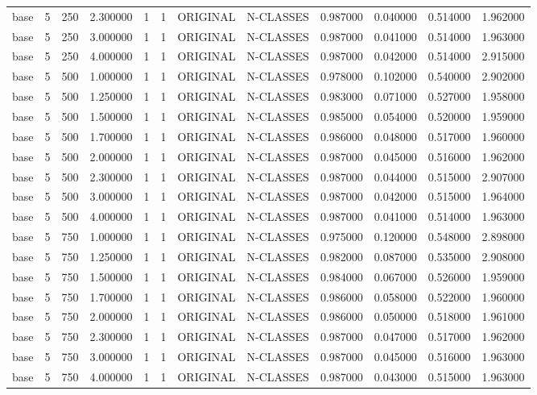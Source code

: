 \begin{tabular}{lrrrllllrrrr}
base & 5 & 250 & 2.300000 & 1 & 1 & ORIGINAL & N-CLASSES & 0.987000 & 0.040000 & 0.514000 & 1.962000 \\
base & 5 & 250 & 3.000000 & 1 & 1 & ORIGINAL & N-CLASSES & 0.987000 & 0.041000 & 0.514000 & 1.963000 \\
base & 5 & 250 & 4.000000 & 1 & 1 & ORIGINAL & N-CLASSES & 0.987000 & 0.042000 & 0.514000 & 2.915000 \\
base & 5 & 500 & 1.000000 & 1 & 1 & ORIGINAL & N-CLASSES & 0.978000 & 0.102000 & 0.540000 & 2.902000 \\
base & 5 & 500 & 1.250000 & 1 & 1 & ORIGINAL & N-CLASSES & 0.983000 & 0.071000 & 0.527000 & 1.958000 \\
base & 5 & 500 & 1.500000 & 1 & 1 & ORIGINAL & N-CLASSES & 0.985000 & 0.054000 & 0.520000 & 1.959000 \\
base & 5 & 500 & 1.700000 & 1 & 1 & ORIGINAL & N-CLASSES & 0.986000 & 0.048000 & 0.517000 & 1.960000 \\
base & 5 & 500 & 2.000000 & 1 & 1 & ORIGINAL & N-CLASSES & 0.987000 & 0.045000 & 0.516000 & 1.962000 \\
base & 5 & 500 & 2.300000 & 1 & 1 & ORIGINAL & N-CLASSES & 0.987000 & 0.044000 & 0.515000 & 2.907000 \\
base & 5 & 500 & 3.000000 & 1 & 1 & ORIGINAL & N-CLASSES & 0.987000 & 0.042000 & 0.515000 & 1.964000 \\
base & 5 & 500 & 4.000000 & 1 & 1 & ORIGINAL & N-CLASSES & 0.987000 & 0.041000 & 0.514000 & 1.963000 \\
base & 5 & 750 & 1.000000 & 1 & 1 & ORIGINAL & N-CLASSES & 0.975000 & 0.120000 & 0.548000 & 2.898000 \\
base & 5 & 750 & 1.250000 & 1 & 1 & ORIGINAL & N-CLASSES & 0.982000 & 0.087000 & 0.535000 & 2.908000 \\
base & 5 & 750 & 1.500000 & 1 & 1 & ORIGINAL & N-CLASSES & 0.984000 & 0.067000 & 0.526000 & 1.959000 \\
base & 5 & 750 & 1.700000 & 1 & 1 & ORIGINAL & N-CLASSES & 0.986000 & 0.058000 & 0.522000 & 1.960000 \\
base & 5 & 750 & 2.000000 & 1 & 1 & ORIGINAL & N-CLASSES & 0.986000 & 0.050000 & 0.518000 & 1.961000 \\
base & 5 & 750 & 2.300000 & 1 & 1 & ORIGINAL & N-CLASSES & 0.987000 & 0.047000 & 0.517000 & 1.962000 \\
base & 5 & 750 & 3.000000 & 1 & 1 & ORIGINAL & N-CLASSES & 0.987000 & 0.045000 & 0.516000 & 1.963000 \\
base & 5 & 750 & 4.000000 & 1 & 1 & ORIGINAL & N-CLASSES & 0.987000 & 0.043000 & 0.515000 & 1.963000 \\

\end{tabular}
